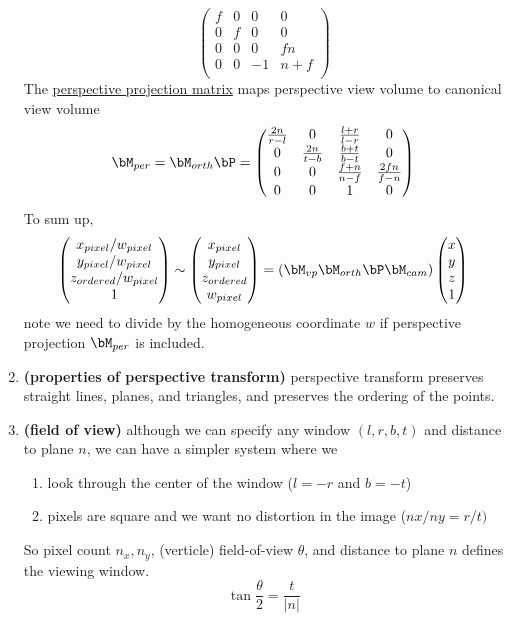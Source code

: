 \documentclass[11pt]{article}
\newcommand{\bheading}[1]{\textbf{(#1)}}
\begin{document}
\begin{enumerate}
\[\begin{pmatrix}
            f & 0 & 0 & 0 \\
            0 & f & 0 & 0 \\
            0 & 0 & 0 & fn \\
            0 & 0 & -1 & n+f \\
        \end{pmatrix}
    \]
    The \underline{perspective projection matrix} maps perspective view volume to canonical view volume
    \[
        \bM_{per} = \bM_{orth} \bP = 
        \begin{pmatrix}
            \frac{2n}{r-l} & 0 & \frac{l+r}{l-r} & 0 \\
            0 & \frac{2n}{t-b} & \frac{b+t}{b-t} & 0 \\
            0 & 0 & \frac{f+n}{n-f} & \frac{2fn}{f-n} \\
            0 & 0 & 1 & 0 \\
        \end{pmatrix}
    \]
    To sum up,
    \[
        \begin{pmatrix}
            x_{pixel} / w_{pixel} \\
            y_{pixel} / w_{pixel} \\
            z_{ordered} / w_{pixel}\\ 
            1 \\
        \end{pmatrix}
        \sim
        \begin{pmatrix}
            x_{pixel} \\ y_{pixel} \\ z_{ordered} \\ w_{pixel}
        \end{pmatrix}
        = 
        (\bM_{vp} \bM_{orth} \bP \bM_{cam})
        \begin{pmatrix}
            x \\ y \\ z \\ 1
        \end{pmatrix}    
    \]
    note we need to divide by the homogeneous coordinate $w$ if perspective projection $\bM_{per}$ is included. 
    \item \bheading{properties of perspective transform} perspective transform preserves straight lines, planes, and triangles, and preserves the ordering of the points.
    \item \bheading{field of view} although we can specify any window $(l,r,b,t)$ and distance to plane $n$, we can have a simpler system where we 
    \begin{enumerate}
        \item look through the center of the window ($l=-r$ and $b=-t$)
        \item pixels are square and we want no distortion in the image ($nx / ny = r / t)$
    \end{enumerate}
    So pixel count $n_x, n_y$, (verticle) field-of-view $\theta$, and distance to plane $n$ defines the viewing window.
    \[
        \tan \frac{\theta}{2} = \frac{t}{|n|}    
    \]
\end{enumerate}
\end{document}
